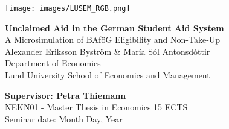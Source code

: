 
    \texttt{[image: images/LUSEM\_RGB.png]} %

\vspace{2cm}
    \begin{center}       
        \vspace*{2cm}
        {\LARGE {\textbf{Unclaimed Aid in the German Student Aid System}  \\ 
          A Microsimulation of BAföG Eligibility and Non-Take-Up
        }} \\
        \vspace{1cm}
        \Large{Alexander Eriksson Byström \& María Sól Antonsdóttir} \normalsize{\\ Department of Economics \\ Lund University School of Economics and Management}
    \end{center}
    \vspace{2cm}

\vfill
\noindent 
\textbf{Supervisor: Petra Thiemann} \\ 
NEKN01 - Master Thesis in Economics 15 ECTS \\ 
Seminar date: Month Day, Year
\thispagestyle{empty}

\newpage
\tableofcontents
\thispagestyle{empty}
